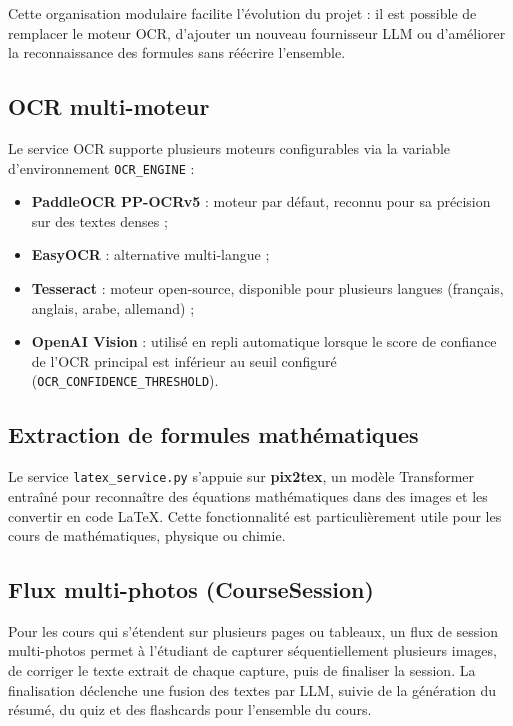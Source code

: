 \documentclass[12pt,a4paper]{report}
\begin{document}
Cette organisation modulaire facilite l'évolution du projet : il est possible de remplacer le moteur OCR, d'ajouter un nouveau fournisseur LLM ou d'améliorer la reconnaissance des formules sans réécrire l'ensemble.

\subsection{OCR multi-moteur}

Le service OCR supporte plusieurs moteurs configurables via la variable d'environnement \texttt{OCR\_ENGINE} :

\begin{itemize}[label=--]
    \item \textbf{PaddleOCR PP-OCRv5} : moteur par défaut, reconnu pour sa précision sur des textes denses ;
    \item \textbf{EasyOCR} : alternative multi-langue ;
    \item \textbf{Tesseract} : moteur open-source, disponible pour plusieurs langues (français, anglais, arabe, allemand) ;
    \item \textbf{OpenAI Vision} : utilisé en repli automatique lorsque le score de confiance de l'OCR principal est inférieur au seuil configuré (\texttt{OCR\_CONFIDENCE\_THRESHOLD}).
\end{itemize}

\subsection{Extraction de formules mathématiques}

Le service \texttt{latex\_service.py} s'appuie sur \textbf{pix2tex}, un modèle Transformer entraîné pour reconnaître des équations mathématiques dans des images et les convertir en code LaTeX. Cette fonctionnalité est particulièrement utile pour les cours de mathématiques, physique ou chimie.

\subsection{Flux multi-photos (CourseSession)}

Pour les cours qui s'étendent sur plusieurs pages ou tableaux, un flux de session multi-photos permet à l'étudiant de capturer séquentiellement plusieurs images, de corriger le texte extrait de chaque capture, puis de finaliser la session. La finalisation déclenche une fusion des textes par LLM, suivie de la génération du résumé, du quiz et des flashcards pour l'ensemble du cours.
\end{document}
